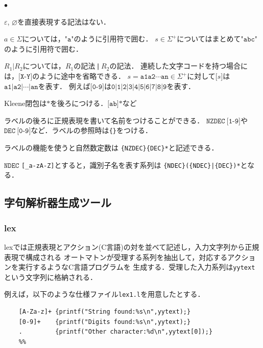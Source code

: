 \documentclass[a4j,dvipdfmx]{jbook}
\begin{document}
  \begin{list}{$\bullet$}{}
    \item $\varepsilon$, $\varnothing$を直接表現する記法はない．
    \item $a\in\Sigma$については，$\texttt{"a"}$のように引用符で囲む．
    $s\in\Sigma^+$についてはまとめて$\texttt{"abc"}$のように引用符で囲む．
    \item $R_1|R_2$については，$R_1$の記法\,\texttt{|}\,$R_2$の記法．
    連続した文字コードを持つ場合には，$\texttt{[X-Y]}$のように途中を省略できる．
    $s=\texttt{a1}\texttt{a2}\cdots\texttt{an}\in\Sigma^+$に対して$\texttt{[}s\texttt{]}$は$\texttt{a1|a2|}\cdots\texttt{|an}$を表す．
    例えば$\texttt{[0-9]}$は$\texttt{0|1|2|3|4|5|6|7|8|9}$を表す．
    \item Kleene閉包は$\texttt{*}$を後ろにつける．$\texttt{[ab]*}$など
    \item ラベルの後ろに正規表現を書いて名前をつけることができる．
    $\texttt{NZDEC}\ \texttt{[1-9]}$や
    $\texttt{DEC}\ \texttt{[0-9]}$など．ラベルの参照時は\verb|{|\verb|}|をつける．
  \end{list}

  ラベルの機能を使うと自然数定数は \verb:{NZDEC}{DEC}*:と記述できる．

  $\texttt{NDEC}$ \verb:[_a-zA-Z]:とすると，識別子名を表す系列は
  \verb;{NDEC}({NDEC}|{DEC})*;となる．


  \subsection{字句解析器生成ツール}

  \subsubsection{lex}

  lexでは正規表現とアクション(C言語)の対を並べて記述し，入力文字列から正規表現で構成される
  オートマトンが受理する系列を抽出して，対応するアクションを実行するようなC言語プログラムを
  生成する．受理した入力系列は\texttt{yytext}という文字列に格納される．

  例えば，以下のような仕様ファイル\texttt{lex1.l}を用意したとする．

  \begin{Verbatim}[frame=single]
    %%
    [A-Za-z]+ {printf("String found:%s\n",yytext);}
    [0-9]+    {printf("Digits found:%s\n",yytext);}
    .         {printf("Other character:%d\n",yytext[0]);}
    %%
  \end{Verbatim}
\end{document}
